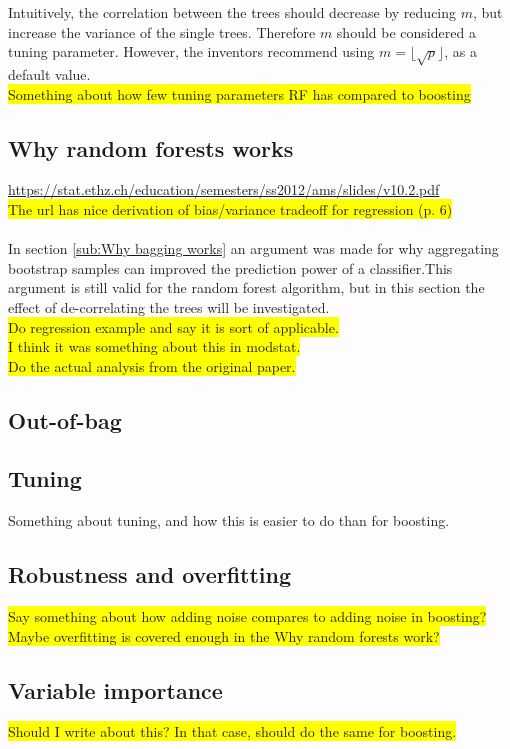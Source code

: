 Intuitively, the correlation between the trees should decrease by reducing $m$, but increase the variance of the single trees. Therefore $m$ should be considered a tuning parameter. However, the inventors recommend using $m = \lfloor \sqrt{p} \rfloor$, as a default value.
\\\colorbox{yellow}{Something about how few tuning parameters RF has compared to boosting}\\

\subsection{Why random forests works}
\label{sub:Why random forests works}
\url{https://stat.ethz.ch/education/semesters/ss2012/ams/slides/v10.2.pdf} \\
\colorbox{yellow}{The url has nice derivation of bias/variance tradeoff for regression (p. 6)}\\
\\
In section \ref{sub:Why bagging works} an argument was made for why aggregating bootstrap samples can improved the prediction power of a classifier.This argument is still valid for the random forest algorithm, but in this section the effect of de-correlating the trees will be investigated.
\\\colorbox{yellow}{Do regression example and say it is sort of applicable.}
\\\colorbox{yellow}{I think it was something about this in modstat.}
\\\colorbox{yellow}{Do the actual analysis from the original paper. }


\subsection{Out-of-bag}
\label{sub:Out-of-bag}

\subsection{Tuning}
\label{sub:Tuning}
Something about tuning, and how this is easier to do than for boosting.

\subsection{Robustness and overfitting}
\label{sub:Robustness and overfitting}
\colorbox{yellow}{Say something about how adding noise compares to adding noise in boosting?}
\\ \colorbox{yellow}{Maybe overfitting is covered enough in the Why random forests work?}

\subsection{Variable importance}
\label{sub:Variable importance}
\colorbox{yellow}{Should I write about this? In that case, should do the same for boosting.}
